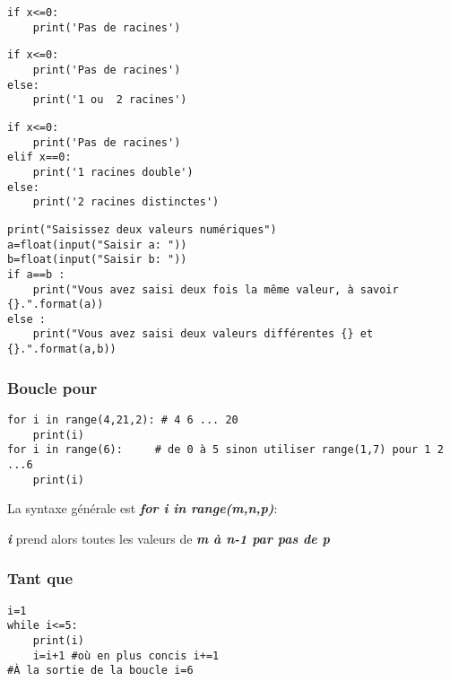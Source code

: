 \documentclass[10pt,dvipsnames,  dvips]{article}
\begin{document}
\hspace{-0.5cm}
\begin{minipage}[t]{5.6cm}
\begin{lstlisting}
if x<=0:
	print('Pas de racines')
\end{lstlisting}
\end{minipage}
\hspace{0.1cm}
\begin{minipage}[t]{6cm}
\begin{lstlisting}
if x<=0:
	print('Pas de racines')
else:
	print('1 ou  2 racines')
\end{lstlisting}
\end{minipage}
\hspace{0.1cm}
\begin{minipage}[t]{6.7cm}
\begin{lstlisting}
if x<=0:
	print('Pas de racines')
elif x==0:
	print('1 racines double')
else:
	print('2 racines distinctes')
\end{lstlisting}
\end{minipage}

\begin{lstlisting}
print("Saisissez deux valeurs numériques")
a=float(input("Saisir a: "))
b=float(input("Saisir b: "))
if a==b :
	print("Vous avez saisi deux fois la même valeur, à savoir {}.".format(a))
else :
	print("Vous avez saisi deux valeurs différentes {} et {}.".format(a,b))
\end{lstlisting}


\subsubsection*{Boucle pour}

\begin{lstlisting}
for i in range(4,21,2): # 4 6 ... 20
	print(i)
for i in range(6):     # de 0 à 5 sinon utiliser range(1,7) pour 1 2 ...6
	print(i)
\end{lstlisting}

La syntaxe générale est \textbf{\textit{for i in range(m,n,p)}}:

\textbf{\textit{i}} prend alors toutes les valeurs de \textbf{\textit{m à n-1 par pas de p}}

\subsubsection*{Tant que}

\begin{lstlisting}
i=1
while i<=5:
	print(i)
	i=i+1 #où en plus concis i+=1
#À la sortie de la boucle i=6
\end{lstlisting}
\end{document}

